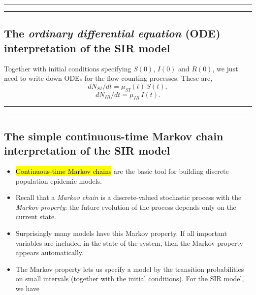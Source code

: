 \documentclass[]{article}
\begin{document}
\begin{center}\rule{0.5\linewidth}{\linethickness}\end{center}

\begin{center}\rule{0.5\linewidth}{\linethickness}\end{center}

\subsection{\texorpdfstring{The \emph{ordinary differential equation}
(ODE) interpretation of the SIR
model}{The ordinary differential equation (ODE) interpretation of the SIR model}}\label{the-ordinary-differential-equation-ode-interpretation-of-the-sir-model}

Together with initial conditions specifying \(S(0)\), \(I(0)\) and
\(R(0)\), we just need to write down ODEs for the flow counting
processes. These are, \[ dN_{SI}/dt = \mu_{SI}(t) \, S(t),\]
\[ dN_{IR}/dt = \mu_{IR}\, I(t).\]

\begin{center}\rule{0.5\linewidth}{\linethickness}\end{center}

\begin{center}\rule{0.5\linewidth}{\linethickness}\end{center}

\subsection{The simple continuous-time Markov chain interpretation of
the SIR
model}\label{the-simple-continuous-time-markov-chain-interpretation-of-the-sir-model}

\begin{itemize}
\item
  \hl{Continuous-time Markov chains} are the basic tool for building discrete
  population epidemic models.
\item
  Recall that a \emph{Markov chain} is a discrete-valued stochastic
  process with the \emph{Markov property}: the future evolution of the
  process depends only on the current state.
\item
  Surprisingly many models have this Markov property. If all important
  variables are included in the state of the system, then the Markov
  property appears automatically.
\item
  The Markov property lets us specify a model by the transition
  probabilities on small intervals (together with the initial
  conditions). For the SIR model, we have
\end{itemize}
\end{document}
